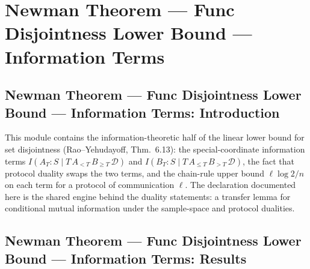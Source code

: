 \section{Newman Theorem --- Func Disjointness Lower Bound --- Information Terms}
\subsection*{Newman Theorem --- Func Disjointness Lower Bound --- Information Terms: Introduction}

This module contains the information-theoretic half of the linear lower bound for set
disjointness (Rao--Yehudayoff, Thm.~6.13): the special-coordinate information terms
$I(A_T : S \mid T\,A_{<T}\,B_{\ge T}\,\mathcal{D})$ and
$I(B_T : S \mid T\,A_{\le T}\,B_{>T}\,\mathcal{D})$, the fact that protocol duality swaps
the two terms, and the chain-rule upper bound $\ell \log 2 / n$ on each term for a protocol
of communication $\ell$.  The declaration documented here is the shared engine behind the
duality statements: a transfer lemma for conditional mutual information under the
sample-space and protocol dualities.

\subsection*{Newman Theorem --- Func Disjointness Lower Bound --- Information Terms: Results}

